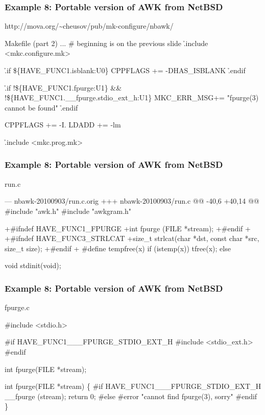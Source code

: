 \documentclass[hyperref={colorlinks=true}]{beamer}
\begin{document}
\begin{frame}[fragile]
  \frametitle{Example 8: Portable version of AWK from NetBSD}

\begin{block}{http://mova.org/\~{}cheusov/pub/mk-configure/nbawk/}
\begin{Code}{Makefile (part 2)}
... # beginning is on the previous slide
\h{.include} <mkc.configure.mk>

\h{.if} \$\{HAVE\_FUNC1.isblank:U0\}
CPPFLAGS +=	-DHAS\_ISBLANK
\h{.endif}

\h{.if} !\$\{HAVE\_FUNC1.fpurge:U1\} &&
   !\$\{HAVE_FUNC1.\_\_fpurge.stdio\_ext\_h:U1\}
MKC\_ERR\_MSG+=	"fpurge(3) cannot be found"
\h{.endif}

CPPFLAGS +=     -I.
LDADD +=        -lm

\h{.include} <mkc.prog.mk>
\end{Code}
\end{block}
\end{frame}

\begin{frame}[fragile]
  \frametitle{Example 8: Portable version of AWK from NetBSD}

\begin{block}{run.c}
\begin{CodeNoLabelSmallest}
--- nbawk-20100903/run.c.orig
+++ nbawk-20100903/run.c
@@ -40,6 +40,14 @@
 #include "awk.h"
 #include "awkgram.h"
 
+#ifndef HAVE_FUNC1_FPURGE
+int fpurge (FILE *stream);
+#endif
+
+#ifndef HAVE\_FUNC3\_STRLCAT
+size\_t strlcat(char *dst, const char *src, size_t size);
+#endif
+
 #define tempfree(x)    if (istemp(x)) tfree(x); else
 
 void stdinit(void);
\end{CodeNoLabelSmallest}
\end{block}
\end{frame}

\begin{frame}[fragile]
  \frametitle{Example 8: Portable version of AWK from NetBSD}

\begin{block}{fpurge.c}
\begin{CodeNoLabelSmallest}
#include <stdio.h>

#if HAVE\_FUNC1\_\_\_FPURGE\_STDIO\_EXT\_H
#include <stdio\_ext.h>
#endif

int fpurge(FILE *stream);

int fpurge(FILE *stream)
\{
#if HAVE\_FUNC1\_\_\_FPURGE\_STDIO\_EXT\_H
  \_\_fpurge (stream);
  return 0;
#else
#error "cannot find fpurge(3), sorry"
#endif
\}
\end{CodeNoLabelSmallest}
\end{block}
\end{frame}
\end{document}
